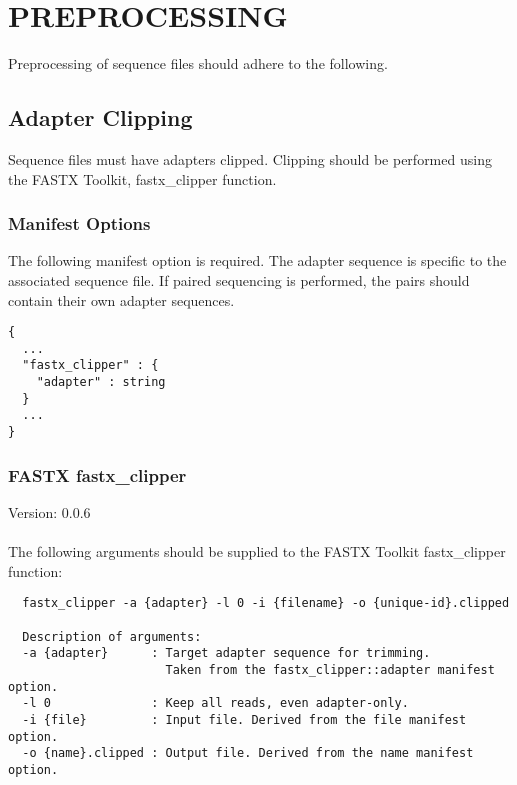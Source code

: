 \section{PREPROCESSING}
Preprocessing of sequence files should adhere to the following.

\subsection{Adapter Clipping}
Sequence files must have adapters clipped. Clipping should be performed using the FASTX Toolkit, fastx\_clipper function.

\subsubsection{Manifest Options}
The following manifest option is required. The adapter sequence is specific to the associated sequence file. If paired sequencing is performed, the pairs should contain their own adapter sequences.
\begin{verbatim}
{
  ...
  "fastx_clipper" : {
    "adapter" : string
  }
  ...
}
\end{verbatim}

\subsubsection{FASTX fastx\_clipper}
Version: 0.0.6 \\\\
The following arguments should be supplied to the FASTX Toolkit fastx\_clipper function:
\begin{verbatim}
  fastx_clipper -a {adapter} -l 0 -i {filename} -o {unique-id}.clipped

  Description of arguments:
  -a {adapter}      : Target adapter sequence for trimming.
                      Taken from the fastx_clipper::adapter manifest option.
  -l 0              : Keep all reads, even adapter-only.
  -i {file}         : Input file. Derived from the file manifest option.
  -o {name}.clipped : Output file. Derived from the name manifest option.
\end{verbatim}
